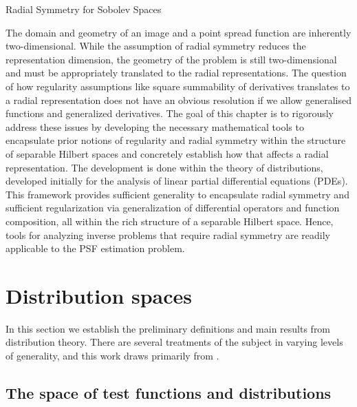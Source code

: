 \setlength{\parindent}{2ex}
\begin{chapter}{Radial Symmetry for Sobolev Spaces}\label{chapter:theoretical}

The domain and geometry of an image and a point spread function are inherently two-dimensional. 
While the assumption of radial symmetry reduces the representation dimension, the geometry of the problem is still two-dimensional and must be appropriately translated to the radial representations. 
The question of how regularity assumptions like square summability of derivatives translates to a radial representation does not have an obvious resolution if we allow generalised functions and generalized derivatives.
The goal of this chapter is to rigorously address these issues by developing the necessary mathematical tools to encapsulate prior notions of regularity and radial symmetry within the structure of separable Hilbert spaces and concretely establish how that affects a radial representation.
The development is done within the theory of distributions, developed initially for the analysis of linear partial differential equations (PDEs). 
This framework provides sufficient generality to encapsulate radial symmetry and sufficient regularization via generalization of differential operators and function composition, all within the rich structure of a separable Hilbert space.
Hence, tools for analyzing inverse problems that require radial symmetry are readily applicable to the PSF estimation problem.

\section{Distribution spaces}
In this section we establish the preliminary definitions and main results from distribution theory.
There are several treatments of the subject in varying levels of generality, and this work draws primarily from \citep{richtmyer1978principles,hormander1983,rudin1991,griffel2002,strichartz2003guide}.

  \subsection{The space of test functions and distributions}


\end{chapter}
